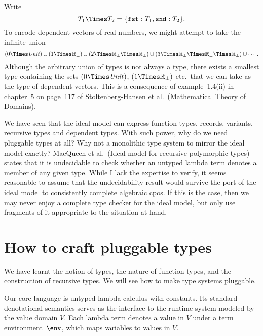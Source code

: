 \documentclass{amsart}
\theoremstyle{definition}
\begin{document}
Write
\[
T_1 \Times T_2 = \{\texttt{fst} : T_1, \texttt{snd} : T_2\}.
\]
To encode dependent vectors of real numbers, we might attempt to
take the infinite union
\[
\def\Unit{\mathit{Unit}}
\def\Real{\mathbb R_\bot}
(0\Times\Unit)\cup(1\Times\Real)\cup
(2\Times\Real\Times\Real)\cup(3\Times\Real\Times\Real\Times\Real)\cup\cdots.
\]
Although the arbitrary union of types is not always a type, there
exists a smallest type containing the sets
$(0\Times\mathit{Unit})$, $(1\Times\mathbb R_\bot)$ etc.\ that we
can take as the type of dependent vectors. This is a consequence
of example~1.4(ii) in chapter~5 on page~117 of Stoltenberg-Hansen
et al.\ (Mathematical Theory of Domains).



We have seen that the ideal model can express function types,
records, variants, recursive types and dependent types. With such
power, why do we need pluggable types at all? Why not a
monolithic type system to mirror the ideal model exactly?
MacQueen et al.\ (Ideal model for recursive polymorphic types)
states that it is undecidable to check whether an untyped lambda
term denotes a member of any given type. While I lack the
expertise to verify, it seems reasonable to assume that the
undecidability result would survive the port of the ideal model
to consistently complete algebraic cpos. If this is the case,
then we may never enjoy a complete type checker for the ideal
model, but only use fragments of it appropriate to the situation
at hand.


\section{How to craft pluggable types}
\label{howto}


\label{after-domain-theory}


We have learnt the notion of types, the nature of function types,
and the construction of recursive types. We will see how to make
type systems pluggable.

Our core language is untyped lambda calculus with constants. Its
standard denotational semantics serves as the interface to the
runtime system modeled by the value domain $V$. Each lambda term
denotes a value in $V$ under a term environment~$\env$, which
maps variables to values in $V$.
\end{document}
